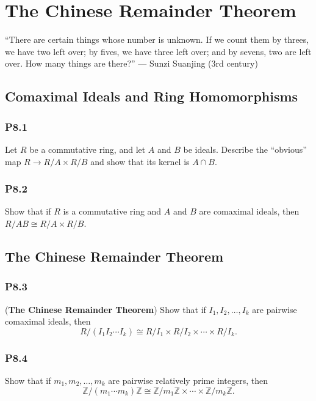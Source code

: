 \documentclass[lang=cn,11pt]{template}
\begin{document}
\chapter{The Chinese Remainder Theorem}

\begin{remark}
“There are certain things whose number is unknown. If we count them by threes, we have two left over; by fives, we have three left over; and by sevens, two are left over. How many things are there?” — Sunzi Suanjing (3rd century)
\end{remark}

\section{Comaximal Ideals and Ring Homomorphisms}

\subsection*{P8.1} Let \( R \) be a commutative ring, and let \( A \) and \( B \) be ideals. Describe the “obvious” map \( R \to R/A \times R/B \) and show that its kernel is \( A \cap B \).

\subsection*{P8.2} Show that if \( R \) is a commutative ring and \( A \) and \( B \) are comaximal ideals, then \( R/AB \cong R/A \times R/B \).

\section{The Chinese Remainder Theorem}

\subsection*{P8.3} (\textbf{The Chinese Remainder Theorem}) Show that if \( I_1, I_2, \ldots, I_k \) are pairwise comaximal ideals, then
\[
R/(I_1 I_2 \cdots I_k) \cong R/I_1 \times R/I_2 \times \cdots \times R/I_k.
\]

\subsection*{P8.4} Show that if \( m_1, m_2, \ldots, m_k \) are pairwise relatively prime integers, then
\[
\mathbb{Z}/(m_1 \cdots m_k)\mathbb{Z} \cong \mathbb{Z}/m_1\mathbb{Z} \times \cdots \times \mathbb{Z}/m_k\mathbb{Z}.
\]
\end{document}
